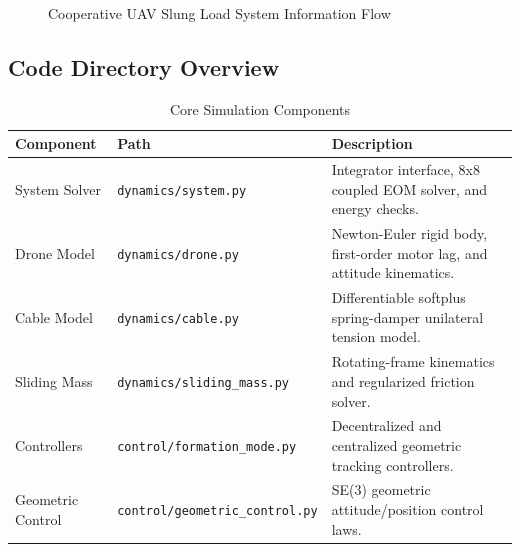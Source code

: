 \documentclass[11pt,a4paper]{article}
\begin{document}
\begin{figure}[H]
    \centering
    \caption{Cooperative UAV Slung Load System Information Flow}
\end{figure}

\subsection{Code Directory Overview}
\begin{table}[H]
    \centering
    \begin{tabularx}{\textwidth}{@{}llX@{}}
        \toprule
        \textbf{Component} & \textbf{Path} & \textbf{Description} \\
        \midrule
        System Solver & \texttt{dynamics/system.py} & Integrator interface, 8x8 coupled EOM solver, and energy checks. \\
        Drone Model & \texttt{dynamics/drone.py} & Newton-Euler rigid body, first-order motor lag, and attitude kinematics. \\
        Cable Model & \texttt{dynamics/cable.py} & Differentiable softplus spring-damper unilateral tension model. \\
        Sliding Mass & \texttt{dynamics/sliding\_mass.py} & Rotating-frame kinematics and regularized friction solver. \\
        Controllers & \texttt{control/formation\_mode.py} & Decentralized and centralized geometric tracking controllers. \\
        Geometric Control & \texttt{control/geometric\_control.py} & SE(3) geometric attitude/position control laws. \\
        \bottomrule
    \end{tabularx}
    \caption{Core Simulation Components}
\end{table}
\end{document}
